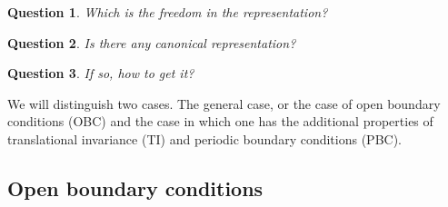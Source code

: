 \documentclass[aps,prl,epsfig,graphics,floatfix,mathbbm,a4paper]{article}
\newtheorem{question}{\indent Question}
\newcommand{\1}{\mathbbm{1}}
\renewcommand{\>}{\rangle}
\newcommand{\<}{\langle}
\begin{document}
\begin{question}\label{quest.can.1}
    Which is the freedom in the representation? \end{question}
\begin{question}\label{quest.can.2} Is there any  {\it canonical}
    representation? \end{question}
\begin{question}\label{quest.can.3}
    If so, how to get it?
\end{question}

We will distinguish two cases. The general case, or the case of
open boundary conditions (OBC) and the case in which one has the
additional properties of translational invariance (TI) and
periodic boundary conditions (PBC).

\subsection{Open boundary conditions}\label{sec:Open}
\end{document}
